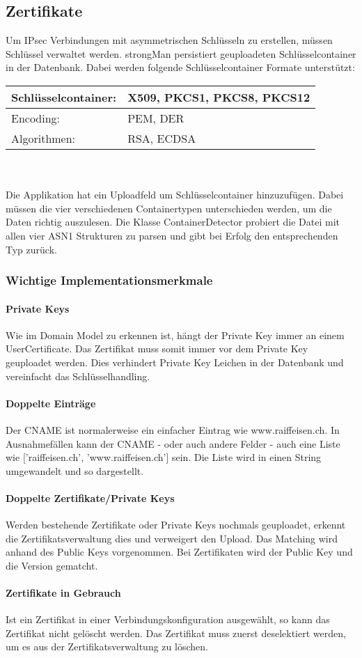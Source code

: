 \subsection{Zertifikate}
Um IPsec Verbindungen mit asymmetrischen Schlüsseln zu erstellen, müssen Schlüssel verwaltet werden. strongMan persistiert geuploadeten Schlüsselcontainer in der Datenbank.
Dabei werden folgende Schlüsselcontainer Formate unterstützt: \\

\begin{tabular}{ | p{} | p{} | }
\hline
    Schlüsselcontainer: & X509, PKCS1, PKCS8, PKCS12 \\ \hline
    Encoding: & PEM, DER \\ \hline
    Algorithmen: & RSA, ECDSA \\ \hline
\end{tabular}
\\\\
Die Applikation hat ein Uploadfeld um Schlüsselcontainer hinzuzufügen. Dabei müssen die vier verschiedenen Containertypen unterschieden werden, um die Daten richtig auszulesen. Die Klasse ContainerDetector probiert die Datei mit allen vier ASN1 Strukturen zu parsen und gibt bei Erfolg den entsprechenden Typ zurück.

\subsubsection{Wichtige Implementationsmerkmale}
\paragraph{Private Keys} Wie im Domain Model zu erkennen ist, hängt der Private Key immer an einem UserCertificate. Das Zertifikat muss somit immer vor dem Private Key geuploadet werden. Dies verhindert Private Key Leichen in der Datenbank und vereinfacht das Schlüsselhandling.

\paragraph{Doppelte Einträge} Der CNAME ist normalerweise ein einfacher Eintrag wie www.raiffeisen.ch. In Ausnahmefällen kann der CNAME - oder auch andere Felder - auch eine Liste wie ['raiffeisen.ch', 'www.raiffeisen.ch'] sein. Die Liste wird in einen String umgewandelt und so dargestellt.

\paragraph{Doppelte Zertifikate/Private Keys}
Werden bestehende Zertifikate oder Private Keys nochmals geuploadet, erkennt die Zertifikatsverwaltung dies und verweigert den Upload. Das Matching wird anhand des Public Keys vorgenommen. Bei Zertifikaten wird der Public Key und die Version gematcht.

\paragraph{Zertifikate in Gebrauch}
Ist ein Zertifikat in einer Verbindungskonfiguration ausgewählt, so kann das Zertifikat nicht gelöscht werden. Das Zertifikat muss zuerst deselektiert werden, um es aus der Zertifikatsverwaltung zu löschen.




